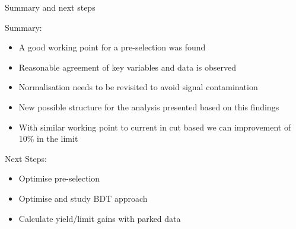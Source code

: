 \documentclass[8pt]{beamer}
\begin{document}
%  
%  
%  
% 
%  

\begin{frame}{Summary and next steps}
 
\begin{block}{Summary:}
 
\begin{itemize}
  \item A good working point for a pre-selection was found
  \item Reasonable agreement of key variables and data is observed
  \item Normalisation needs to be revisited to avoid signal contamination
  \item New possible structure for the analysis presented based on this findings 
  \item With similar working point to current in cut based we can improvement of 10\% in the limit
\end{itemize}

\end{block}

\begin{block}{Next Steps:}
 
\begin{itemize}
  \item Optimise pre-selection
  \item Optimise and study BDT approach
  \item Calculate yield/limit gains with parked data 
\end{itemize}
 
\end{block}

\end{frame}
\end{document}

